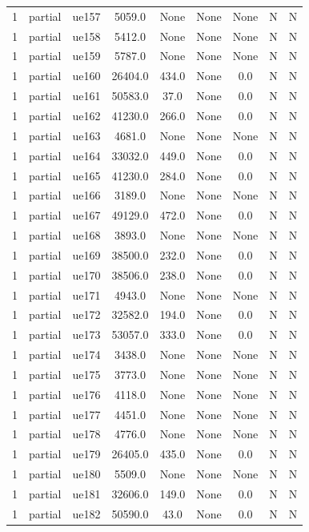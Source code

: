 \begin{table}[ht]
\begin{tabular}{|c|c|c|c|c|c|c|c|c|}
1 & partial & ue157 & 5059.0 & None & None & None & N & N \\
1 & partial & ue158 & 5412.0 & None & None & None & N & N \\
1 & partial & ue159 & 5787.0 & None & None & None & N & N \\
1 & partial & ue160 & 26404.0 & 434.0 & None & 0.0 & N & N \\
1 & partial & ue161 & 50583.0 & 37.0 & None & 0.0 & N & N \\
1 & partial & ue162 & 41230.0 & 266.0 & None & 0.0 & N & N \\
1 & partial & ue163 & 4681.0 & None & None & None & N & N \\
1 & partial & ue164 & 33032.0 & 449.0 & None & 0.0 & N & N \\
1 & partial & ue165 & 41230.0 & 284.0 & None & 0.0 & N & N \\
1 & partial & ue166 & 3189.0 & None & None & None & N & N \\
1 & partial & ue167 & 49129.0 & 472.0 & None & 0.0 & N & N \\
1 & partial & ue168 & 3893.0 & None & None & None & N & N \\
1 & partial & ue169 & 38500.0 & 232.0 & None & 0.0 & N & N \\
1 & partial & ue170 & 38506.0 & 238.0 & None & 0.0 & N & N \\
1 & partial & ue171 & 4943.0 & None & None & None & N & N \\
1 & partial & ue172 & 32582.0 & 194.0 & None & 0.0 & N & N \\
1 & partial & ue173 & 53057.0 & 333.0 & None & 0.0 & N & N \\
1 & partial & ue174 & 3438.0 & None & None & None & N & N \\
1 & partial & ue175 & 3773.0 & None & None & None & N & N \\
1 & partial & ue176 & 4118.0 & None & None & None & N & N \\
1 & partial & ue177 & 4451.0 & None & None & None & N & N \\
1 & partial & ue178 & 4776.0 & None & None & None & N & N \\
1 & partial & ue179 & 26405.0 & 435.0 & None & 0.0 & N & N \\
1 & partial & ue180 & 5509.0 & None & None & None & N & N \\
1 & partial & ue181 & 32606.0 & 149.0 & None & 0.0 & N & N \\
1 & partial & ue182 & 50590.0 & 43.0 & None & 0.0 & N & N \\

\end{tabular}
\end{table}
